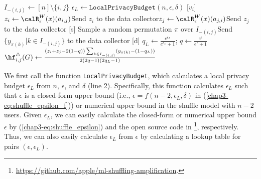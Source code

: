 \setlength{\algomargin}{5mm}
\begin{algorithm}[t]
  \SetAlgoLined
  $I_{-(i,j)} \leftarrow [n]\setminus\{i,j\}$\;
  $\epsilon_L \leftarrow \texttt{LocalPrivacyBudget}(n,\epsilon,\delta)$\;
  [$v_i$] $z_i \leftarrow \calR_{\epsilon}^W(x)(a_{i,j})$\;
  [$v_i$] Send $z_i$ to the data collector\;
  [$v_j$] $z_j \leftarrow \calR_{\epsilon}^W(x)(a_{j,i})$\;
  [$v_j$] Send $z_j$ to the data collector\;
  [s] Sample a random permutation $\pi$ over $I_{-(i,j)}$\;
  [s] Send $\{y_{\pi(k)} | k \in I_{-(i,j)}\}$ to the data collector\;
  [d] $q_L \leftarrow \frac{e^{\epsilon_L}}{e^{\epsilon_L}+1}$; $q \leftarrow \frac{e^\epsilon}{e^\epsilon+1}$\;
  [d] $\hf_{i,j}^\triangle(G) \leftarrow \frac{(z_i+z_j-2(1-q))\sum_{k \in I_{-(i,j)}} (y_{\pi(k)} - (1-q_L))}{2(2q-1)(2q_L-1)}$\;
  \caption{Our wedge shuffle algorithm \AlgWS{}.
  [$v_i$], [s], [d] represent that the process is run by user $v_i$, the shuffler, and the data collector, respectively. 
  }\label{chap3-alg:wshuffle}
\end{algorithm}

We first call the function \texttt{LocalPrivacyBudget}, which calculates a local privacy budget $\epsilon_L$ from $n$, $\epsilon$, and $\delta$ (line 2). 
Specifically, this function calculates $\epsilon_L$ 
such that $\epsilon$ is a closed-form upper bound (i.e., $\epsilon = f(n-2, \epsilon_L, \delta)$ in (\ref{chap3-eq:shuffle_epsilon_f})) or numerical upper bound in the shuffle model with $n-2$ users. 
Given $\epsilon_L$, we can easily calculate the closed-form or numerical upper bound $\epsilon$ by (\ref{chap3-eq:shuffle_epsilon}) and the open source code in \cite{Feldman_FOCS21}\footnote{\url{https://github.com/apple/ml-shuffling-amplification}.}, respectively. 
Thus, we can also easily calculate $\epsilon_L$ from $\epsilon$ by calculating a lookup table for pairs $(\epsilon, \epsilon_L)$. 

